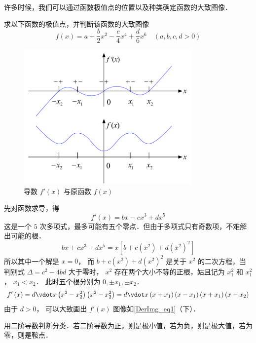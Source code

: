

许多时候，我们可以通过函数极值点的位置以及种类确定函数的大致图像．

\begin{exam}{}
求以下函数的极值点，并判断该函数的大致图像
\begin{equation}
f\left( x \right) = a + \frac{b}{2}{x^2} - \frac{c}{4}{x^4} + \frac{d}{6}{x^6} \quad (a,b,c,d >0)
\end{equation}

\begin{figure}[ht]
\centering
\includegraphics[width=9cm]{./figures/DerImg.pdf}
\caption{导数 $f'(x)$ 与原函数 $f(x)$}\label{DerImg_eq1}
\end{figure}

先对函数求导，得
\begin{equation}
f'\left( x \right) = bx - c{x^3} + d{x^5} 
\end{equation}
这是一个 $5$ 次多项式，最多可能有五个零点．但由于多项式只有奇数项，不难解出可能的根．
 \begin{equation}
bx + c{x^3} + d{x^5} = x[{b + c({x^2}) + d{{({x^2})}^2}} ]
\end{equation}
所以其中一个解是 $x = 0$， 而 $b + c({x^2}) + d{({x^2})^2}$ 是关于 ${x^2}$ 的二次方程，当判别式 $\Delta  = {c^2} - 4bd$ 大于零时， ${x^2}$ 存在两个大小不等的正根，姑且记为 $x_1^2$ 和 $x_1^2$， ${x_1} < {x_2}$． 
此时五个根分别为 $0, \pm {x_1},\pm {x_2}$． 
\begin{equation}
f'\left( x \right) = d \vdot x\left( {{x^2} - x_2^2} \right)\left( {{x^2} - x_2^2} \right) = d \vdot x\left( {x + {x_1}} \right)\left( {x - {x_1}} \right)\left( {x + {x_1}} \right)\left( {x - {x_2}} \right)
\end{equation} 
由于 $d > 0$， 可以大致画出 $f'(x)$ 图像如\autoref{DerImg_eq1}（下）．


用二阶导数判断分类．若二阶导数为正，则是极小值，若为负，则是极大值，若为零，则是鞍点．


\end{exam}